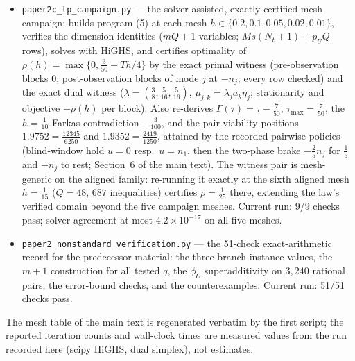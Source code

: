 \documentclass[10pt,article]{article}
\providecommand{\tightlist}{\setlength{\itemsep}{0pt}\setlength{\parskip}{0pt}}
\begin{document}
\begin{itemize}\tightlist
\item \texttt{paper2c\_lp\_campaign.py} --- the solver-assisted, exactly certified mesh
campaign: builds program (5) at each mesh \(h \in \{0.2, 0.1, 0.05, 0.02,
0.01\}\), verifies the dimension identities (\(mQ{+}1\) variables;
\(Ms(N_t{+}1) + p_U Q\) rows), solves with HiGHS, and certifies optimality of
\(\rho(h) = \max\{0, \tfrac{3}{50} - Th/4\}\) by the exact primal witness
(pre-observation blocks \(0\); post-observation blocks of mode \(j\) at
\(-n_j\); every row checked) and the exact dual witness
(\(\lambda = (\tfrac38, \tfrac5{16}, \tfrac5{16})\),
\(\mu_{j,k} = \lambda_j a_k \eta_j\); stationarity and objective \(-\rho(h)\)
per block). Also re-derives \(\Gamma(\tau) = \tau - \tfrac7{50}\),
\(\tau_{\max} = \tfrac7{50}\), the \(h = \tfrac1{10}\) Farkas contradiction
\(-\tfrac3{100}\), and the pair-viability positions \(1.9752 = \tfrac{12345}{6250}\) and
\(1.9352 = \tfrac{2419}{1250}\), attained by the recorded pairwise
policies (blind-window hold \(u = 0\) resp.\ \(u = n_1\), then the
two-phase brake \(-\tfrac25 n_j\) for \(\tfrac15\) and \(-n_j\) to
rest; Section~6 of the main text). The witness pair is mesh-generic on
the aligned family: re-running it exactly at the sixth aligned mesh
\(h = \tfrac1{15}\) (\(Q = 48\), \(687\) inequalities) certifies
\(\rho = \tfrac1{25}\) there, extending the law's verified domain
beyond the five campaign meshes. Current run: 9/9 checks pass; solver agreement at most
\(4.2 \times 10^{-17}\) on all five meshes.
\item \texttt{paper2\_nonstandard\_verification.py} --- the 51-check
exact-arithmetic record for the predecessor material: the three-branch
instance values, the \(m+1\) construction for all tested \(q\), the
\(\phi_U\) superadditivity on \(3{,}240\) rational pairs, the error-bound
checks, and the counterexamples. Current run: 51/51 checks pass.
\end{itemize}

The mesh table of the main text is regenerated verbatim by the first script;
the reported iteration counts and wall-clock times are measured values from
the run recorded here (scipy HiGHS, dual simplex), not estimates.
\end{document}
